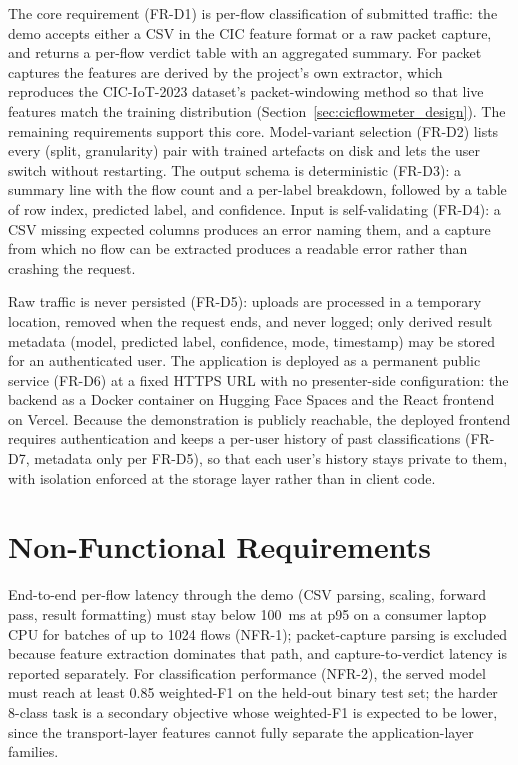 \par The core requirement (FR-D1) is per-flow classification of submitted traffic: the demo accepts either a CSV in the CIC feature format or a raw packet capture, and returns a per-flow verdict table with an aggregated summary. For packet captures the features are derived by the project's own extractor, which reproduces the CIC-IoT-2023 dataset's packet-windowing method so that live features match the training distribution (Section~\ref{sec:cicflowmeter_design}). The remaining requirements support this core. Model-variant selection (FR-D2) lists every (split, granularity) pair with trained artefacts on disk and lets the user switch without restarting. The output schema is deterministic (FR-D3): a summary line with the flow count and a per-label breakdown, followed by a table of row index, predicted label, and confidence. Input is self-validating (FR-D4): a CSV missing expected columns produces an error naming them, and a capture from which no flow can be extracted produces a readable error rather than crashing the request.

\par Raw traffic is never persisted (FR-D5): uploads are processed in a temporary location, removed when the request ends, and never logged; only derived result metadata (model, predicted label, confidence, mode, timestamp) may be stored for an authenticated user. The application is deployed as a permanent public service (FR-D6) at a fixed HTTPS URL with no presenter-side configuration: the backend as a Docker container on Hugging Face Spaces and the React frontend on Vercel. Because the demonstration is publicly reachable, the deployed frontend requires authentication and keeps a per-user history of past classifications (FR-D7, metadata only per FR-D5), so that each user's history stays private to them, with isolation enforced at the storage layer rather than in client code.

\section{Non-Functional Requirements}
\label{sec:non_functional_requirements}

\par End-to-end per-flow latency through the demo (CSV parsing, scaling, forward pass, result formatting) must stay below 100~ms at p95 on a consumer laptop CPU for batches of up to 1024 flows (NFR-1); packet-capture parsing is excluded because feature extraction dominates that path, and capture-to-verdict latency is reported separately. For classification performance (NFR-2), the served model must reach at least 0.85 weighted-F1 on the held-out binary test set; the harder 8-class task is a secondary objective whose weighted-F1 is expected to be lower, since the transport-layer features cannot fully separate the application-layer families.

